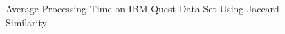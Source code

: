\begin{figure}[htb]
{\label{questVna}}
\quad
{}
\quad
{}

\caption{Average Processing Time on IBM Quest Data Set Using Jaccard Similarity}
\label{ibmTestsAvgEff}
\end{figure}

